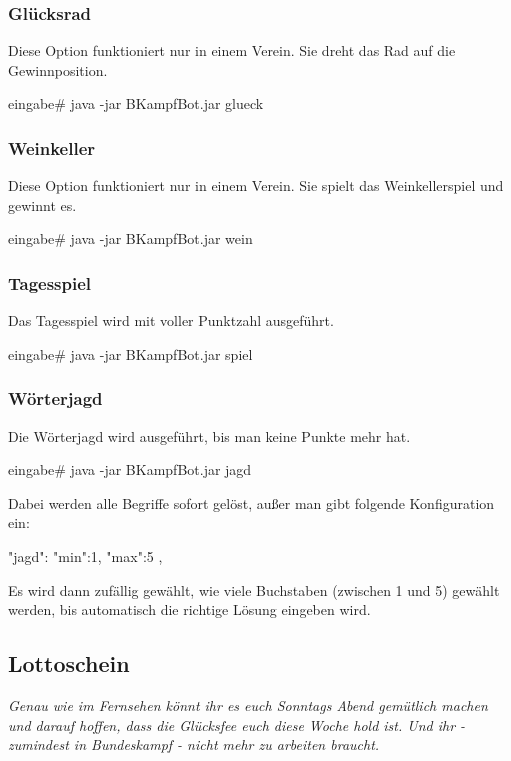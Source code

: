 \documentclass{scrartcl}
\begin{document}
\subsubsection{Glücksrad}
Diese Option funktioniert nur in einem Verein. Sie dreht das Rad auf die Gewinnposition.

\begin{code}[emph={glueck}]
eingabe# java -jar BKampfBot.jar glueck
\end{code}


\subsubsection{Weinkeller}
Diese Option funktioniert nur in einem Verein. Sie spielt das Weinkellerspiel und gewinnt es.

\begin{code}[emph={wein}]
eingabe# java -jar BKampfBot.jar wein
\end{code}


\subsubsection{Tagesspiel}
Das Tagesspiel wird mit voller Punktzahl ausgeführt.

\begin{code}[emph={spiel}]
eingabe# java -jar BKampfBot.jar spiel
\end{code}


\subsubsection{Wörterjagd}
\label{jagd}
Die Wörterjagd wird ausgeführt, bis man keine Punkte mehr hat. 

\begin{code}[emph={jagd}]
eingabe# java -jar BKampfBot.jar jagd
\end{code}

Dabei werden alle Begriffe sofort gelöst, außer man gibt folgende Konfiguration ein:

\begin{code}[language=bash]
"jagd":{
	"min":1,
	"max":5
},
\end{code}

Es wird dann zufällig gewählt, wie viele Buchstaben (zwischen 1 und 5) gewählt
werden, bis automatisch die richtige Lösung eingeben wird.

\subsection{Lottoschein}
\textit{Genau wie im Fernsehen könnt ihr es euch Sonntags Abend gemütlich machen und darauf hoffen, dass die Glücksfee euch diese Woche hold ist. Und ihr - zumindest in Bundeskampf - nicht mehr zu arbeiten braucht.}
\end{document}
